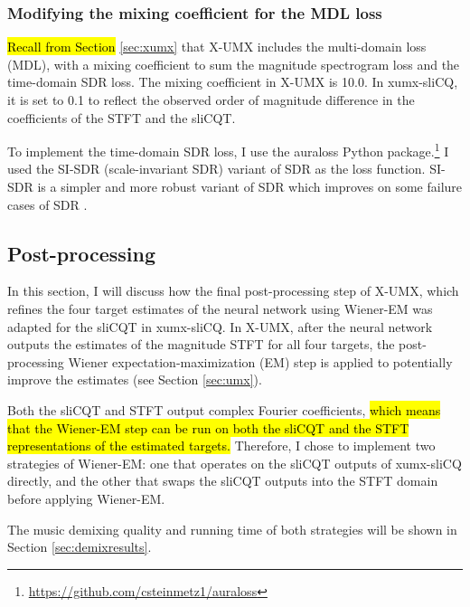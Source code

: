 \documentclass[report.tex]{subfiles}
\begin{document}
\subsubsection{Modifying the mixing coefficient for the MDL loss}
\label{sec:xumxinc}

\hl{Recall from Section} \ref{sec:xumx} that X-UMX includes the multi-domain loss (MDL), with a mixing coefficient to sum the magnitude spectrogram loss and the time-domain SDR loss. The mixing coefficient in X-UMX is 10.0. In xumx-sliCQ, it is set to 0.1 to reflect the observed order of magnitude difference in the coefficients of the STFT and the sliCQT.

To implement the time-domain SDR loss, I use the auraloss Python package.\footnote{\url{https://github.com/csteinmetz1/auraloss}} I used the SI-SDR (scale-invariant SDR) \parencite{roux2018sdr} variant of SDR as the loss function. SI-SDR is a simpler and more robust variant of SDR which improves on some failure cases of SDR \parencite{roux2018sdr}.


\newpagefill

\subsection{Post-processing}
\label{sec:postprocessing}

In this section, I will discuss how the final post-processing step of X-UMX, which refines the four target estimates of the neural network using Wiener-EM was adapted for the sliCQT in xumx-sliCQ. In X-UMX, after the neural network outputs the estimates of the magnitude STFT for all four targets, the post-processing Wiener expectation-maximization (EM) step is applied to potentially improve the estimates (see Section \ref{sec:umx}).

Both the sliCQT and STFT output complex Fourier coefficients, \hl{which means that the Wiener-EM step can be run on both the sliCQT and the STFT representations of the estimated targets.} Therefore, I chose to implement two strategies of Wiener-EM: one that operates on the sliCQT outputs of xumx-sliCQ directly, and the other that swaps the sliCQT outputs into the STFT domain before applying Wiener-EM.

The music demixing quality and running time of both strategies will be shown in Section \ref{sec:demixresults}.
\end{document}
